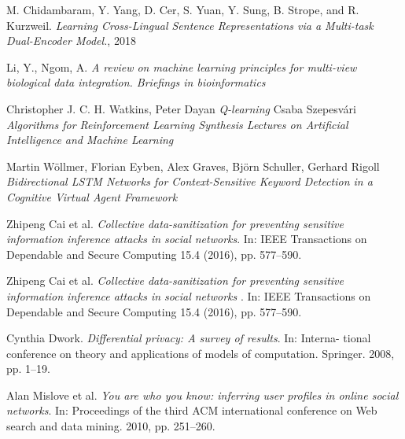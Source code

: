 \begin{thebibliography}{9}
M. Chidambaram, Y. Yang, D. Cer, S. Yuan, Y. Sung, B. Strope, and R. Kurzweil. \newline
\textit{Learning Cross-Lingual Sentence Representations via a Multi-task Dual-Encoder Model.}, 2018

Li, Y., Ngom, A.\newline
\textit{A review on machine learning principles for multi-view biological data integration. Briefings in bioinformatics}

Christopher J. C. H. Watkins, Peter Dayan\newline
\textit{Q-learning}
Csaba Szepesvári\newline
\textit{Algorithms for Reinforcement Learning
Synthesis Lectures on Artificial Intelligence and Machine Learning}

Martin Wöllmer, Florian Eyben, Alex Graves, Björn Schuller, Gerhard Rigoll \newline
\textit{Bidirectional LSTM Networks for Context-Sensitive Keyword Detection in a Cognitive Virtual Agent Framework}

Zhipeng Cai et al.\newline
\textit{Collective data-sanitization for preventing sensitive information inference attacks in social networks}.\newline
In: IEEE Transactions on Dependable and Secure Computing 15.4 (2016), pp. 577–590.

Zhipeng Cai et al.\newline
\textit{Collective data-sanitization for preventing sensitive information inference attacks in social networks}\newline
. In: IEEE Transactions on Dependable and Secure Computing 15.4 (2016), pp. 577–590.

Cynthia Dwork.\newline
\textit{Differential privacy: A survey of results}.\newline
In: Interna- tional conference on theory and applications of models of computation. Springer. 2008, pp. 1–19.

Alan Mislove et al. \newline
\textit{You are who you know: inferring user profiles in online social networks}.\newline
In: Proceedings of the third ACM international conference on Web search and data mining. 2010, pp. 251–260.


\end{thebibliography}
